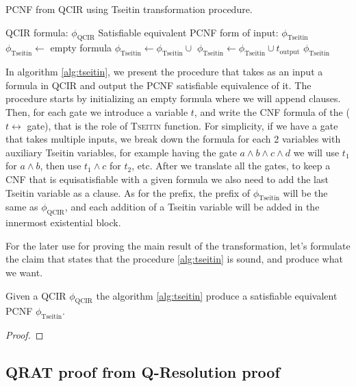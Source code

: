 \begin{algorithm}[H]
\caption{PCNF from QCIR using Tseitin transformation procedure.}\label{alg:tseitin}
\begin{algorithmic}[1]
\Require QCIR formula: $\phi_\text{QCIR}$
\Ensure Satisfiable equivalent PCNF form of input: $\phi_\text{Tseitin}$
\State $\phi_\text{Tseitin} \gets$ empty formula
    \State $\phi_\text{Tseitin} \gets \phi_\text{Tseitin} \cup$ 
\EndFor
\State $\phi_\text{Tseitin} \gets \phi_\text{Tseitin} \cup t_\text{output}$
\State \Return $\phi_\text{Tseitin}$
\EndProcedure
\end{algorithmic}
\end{algorithm}

In algorithm \ref{alg:tseitin}, we present the procedure that takes as an input a formula in QCIR and output the PCNF satisfiable equivalence of it. The procedure starts by initializing an empty formula where we will append clauses. Then, for each gate we introduce a variable $t$, and write the CNF formula of the ($t \leftrightarrow $ gate), that is the role of \textsc{Tseitin} function. For simplicity, if we have a gate that takes multiple inputs, we break down the formula for each 2 variables with auxiliary Tseitin variables, for example having the gate $a \land b \land c \land d$ we will use $t_1$ for $a \land b$, then use $t_1 \land c$ for $t_2$, etc. After we translate all the gates, to keep a CNF that is equisatisfiable with a given formula we also need to add the last Tseitin variable as a clause. As for the prefix, the prefix of $\phi_\text{Tseitin}$ will be the same as $\phi_\text{QCIR}$, and each addition of a Tseitin variable will be added in the innermost existential block.

For the later use for proving the main result of the transformation, let's formulate the claim that states that the procedure \ref{alg:tseitin} is sound, and produce what we want.

\begin{claim}
    Given a QCIR $\phi_\text{QCIR}$ the algorithm \ref{alg:tseitin} produce a satisfiable equivalent PCNF $\phi_\text{Tseitin}$.
\end{claim}

\begin{proof}
\end{proof}

\subsection{QRAT proof from Q-Resolution proof}\label{qrat:fromqres}

